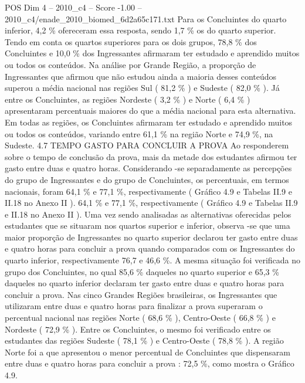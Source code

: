\begin{textsample}{POS Dim 4 – 2010\_c4 – Score -1.00 – 2010\_c4/enade\_2010\_biomed\_6d2a65c171.txt}
Para os Concluintes do quarto inferior, 4,2 \% ofereceram essa resposta, sendo 1,7 \% os do quarto superior.
Tendo em conta os quartos superiores para os dois grupos, 78,8 \% dos Concluintes e 10,0 \% dos Ingressantes afirmaram ter estudado e aprendido muitos ou todos os conteúdos.
Na análise por Grande Região, a proporção de Ingressantes que afirmou que não estudou ainda a maioria desses conteúdos superou a média nacional nas regiões Sul ( 81,2 \% ) e Sudeste ( 82,0 \% ).
Já entre os Concluintes, as regiões Nordeste ( 3,2 \% ) e Norte ( 6,4 \% ) apresentaram percentuais maiores do que a média nacional para esta alternativa.
Em todas as regiões, os Concluintes afirmaram ter estudado e aprendido muitos ou todos os conteúdos, variando entre 61,1 \% na região Norte e 74,9 \%, na Sudeste. 4.7 TEMPO GASTO PARA CONCLUIR A PROVA Ao responderem sobre o tempo de conclusão da prova, mais da metade dos estudantes afirmou ter gasto entre duas e quatro horas.
Considerando -se separadamente as percepções do grupo de Ingressantes e do grupo de Concluintes, os percentuais, em termos nacionais, foram 64,1 \% e 77,1 \%, respectivamente ( Gráfico 4.9 e Tabelas II.9 e II.18 no Anexo II ). 64,1 \% e 77,1 \%, respectivamente ( Gráfico 4.9 e Tabelas II.9 e II.18 no Anexo II ).
Uma vez sendo analisadas as alternativas oferecidas pelos estudantes que se situaram nos quartos superior e inferior, observa -se que uma maior proporção de Ingressantes no quarto superior declarou ter gasto entre duas e quatro horas para concluir a prova quando comparados com os Ingressantes do quarto inferior, respectivamente 76,7 e 46,6 \%.
A mesma situação foi verificada no grupo dos Concluintes, no qual 85,6 \% daqueles no quarto superior e 65,3 \% daqueles no quarto inferior declaram ter gasto entre duas e quatro horas para concluir a prova.
Nas cinco Grandes Regiões brasileiras, os Ingressantes que utilizaram entre duas e quatro horas para finalizar a prova superaram o percentual nacional nas regiões Norte ( 68,6 \% ), Centro-Oeste ( 66,8 \% ) e Nordeste ( 72,9 \% ).
Entre os Concluintes, o mesmo foi verificado entre os estudantes das regiões Sudeste ( 78,1 \% ) e Centro-Oeste ( 78,8 \% ).
A região Norte foi a que apresentou o menor percentual de Concluintes que dispensaram entre duas e quatro horas para concluir a prova : 72,5 \%, como mostra o Gráfico 4.9.

\end{textsample}
